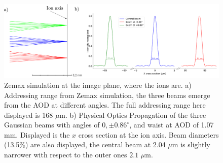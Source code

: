 \begin{figure}
     \centering
     \centering
     \includegraphics[width=1\textwidth]{img/range_plus_3beams}
     \caption{Zemax simulation at the image plane, where the ions are. a) Addressing range from Zemax simulation, the three beams emerge from the AOD at different angles. The full addressing range here displayed is 168 $\mu$m. b) Physical Optics Propagation of the three Gaussian beams with angles of $0,\pm0.86^\circ$, and waist at AOD of 1.07 mm. Displayed is the $x$ cross section at the ion axis. Beam diameters (13.5\%) are also displayed, the central beam at 2.04 $\mu$m is slightly narrower with respect to the outer ones $2.1$ $\mu$m.}
     \label{zemaxrange}
\end{figure}

